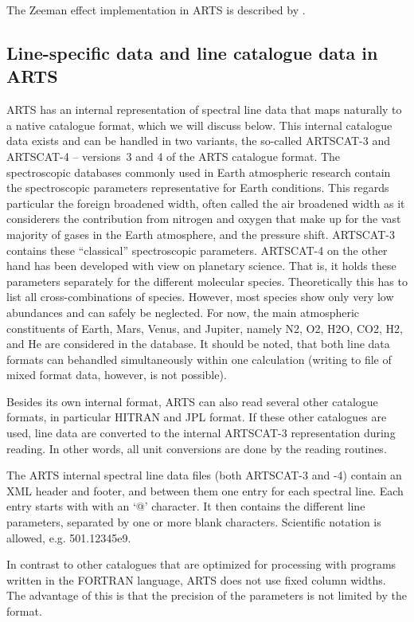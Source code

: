 The Zeeman effect implementation in ARTS is described by \citet{larsson14:_treatment_jqsrt}.

\subsection{Line-specific data and line catalogue data in ARTS} 
\label{sec:abs_theory:catalogue_formats}

ARTS has an internal representation of spectral line data that maps
naturally to a native catalogue format, which we will discuss
below. This internal catalogue data exists and can be
handled in two variants, the so-called ARTSCAT-3 and ARTSCAT-4 -- versions~3
and 4 of the ARTS catalogue format. The spectroscopic databases commonly
used in Earth atmospheric research contain the spectroscopic parameters
representative for Earth conditions. This regards particular the foreign
broadened width, often called the air broadened width as it considerers
the contribution from nitrogen and oxygen that make up for the vast majority
of gases in the Earth atmosphere, and the pressure shift. ARTSCAT-3 contains
these ``classical'' spectroscopic parameters. ARTSCAT-4 on the other hand has
been developed with view on planetary science. That is, it holds these
parameters separately for the different molecular species. Theoretically this
has to list all cross-combinations of species. However, most species show only
very low abundances and can safely be neglected. For now, the main atmospheric
constituents of Earth, Mars, Venus, and Jupiter, namely N2, O2, H2O, CO2, H2,
and He are considered in the database.
It should be noted, that both line data formats can behandled simultaneously
within one calculation (writing to file of mixed format data, however, is not
possible).

Besides its own internal format, ARTS can also read several other catalogue
formats, in particular HITRAN and JPL format. If these other catalogues are used,
line data are converted to the internal ARTSCAT-3 representation during
reading. In other words, all unit conversions are done by the reading
routines.

The ARTS internal spectral line data files (both ARTSCAT-3 and -4) contain
an XML header and footer, and between them one entry for each spectral line.
Each entry starts with with an `@' character. It then contains the different line
parameters, separated by one or more blank characters. Scientific
notation is allowed, e.g. 501.12345e9.  

In contrast to other catalogues that are optimized for processing with
programs written in the FORTRAN language, ARTS does not use fixed
column widths. The advantage of this is that the precision of the
parameters is not limited by the format.


